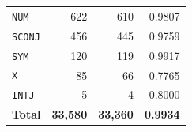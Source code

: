 \begin{table}[ht]
\begin{minipage}[t]{0.42\linewidth}
\begin{tabular}{lrrr}
\texttt{NUM} & 622 & 610 & 0.9807 \\
\texttt{SCONJ} & 456 & 445 & 0.9759 \\
\texttt{SYM} & 120 & 119 & 0.9917 \\
\texttt{X} & 85 & 66 & 0.7765 \\
\texttt{INTJ} & 5 & 4 & 0.8000 \\
\midrule
\textbf{Total} & \textbf{33,580} & \textbf{33,360} & \textbf{0.9934} \\
\bottomrule
\end{tabular}
\end{minipage}
\end{table}
